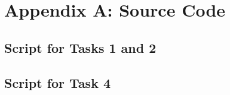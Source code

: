 \section{Appendix A: Source Code}

\subsection{Script for Tasks 1 and 2}



\pagebreak

\subsection{Script for Task 4}


